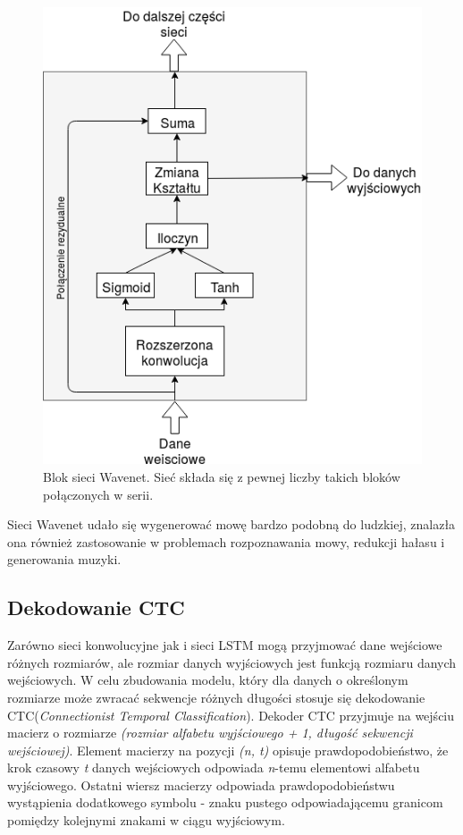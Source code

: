\documentclass[a4paper,11pt,twoside]{report}
\theoremstyle{definition}
\begin{document}
\begin{figure}[h!]
	\centering
	\includegraphics[scale=0.7]{wavenet_block}
	\caption{Blok sieci Wavenet. Sieć składa się z pewnej liczby takich bloków połączonych w serii.}
	\label{fig:wavenet_block}
\end{figure}

Sieci Wavenet udało się wygenerować mowę bardzo podobną do ludzkiej\cite{wavenet}, znalazła ona również zastosowanie w problemach rozpoznawania mowy, redukcji hałasu i generowania muzyki\cite{wavenetReview}.

\subsection{Dekodowanie CTC}

Zarówno sieci konwolucyjne jak i sieci LSTM mogą przyjmować dane wejściowe różnych rozmiarów, ale rozmiar danych wyjściowych jest funkcją rozmiaru danych wejściowych. W celu zbudowania modelu, który dla danych o określonym rozmiarze może zwracać sekwencje różnych długości stosuje się dekodowanie CTC(\textit{Connectionist Temporal Classification})\cite{ctc}. Dekoder CTC przyjmuje na wejściu macierz o rozmiarze \textit{(rozmiar alfabetu wyjściowego + 1, długość sekwencji wejściowej)}. Element macierzy na pozycji  \textit{(n, t)} opisuje prawdopodobieństwo, że krok czasowy \textit{t} danych wejściowych odpowiada \textit{n}-temu elementowi alfabetu wyjściowego. Ostatni wiersz macierzy odpowiada prawdopodobieństwu wystąpienia dodatkowego symbolu - znaku pustego odpowiadającemu granicom pomiędzy kolejnymi znakami w ciągu wyjściowym. 
\end{document}
